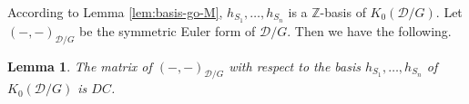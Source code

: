 \documentclass[12pt,reqno]{amsart}
\numberwithin{equation}{section}
\newcommand{\Hom}{\operatorname{Hom}\nolimits}
\newcommand{\go}{{K_0}}
\newtheorem{lemma}[theorem]{Lemma}
\begin{document}
	
	
	
	
	
	
	
	
	
	
	
	
	
	
	
	According to Lemma \ref{lem:basis-go-M}, $h_{S_1},\ldots, h_{S_n}$ is a $\mathbb{Z}$-basis of $\go(\mathcal{D}/G)$. Let $(-,-)_{\mathcal{D}/G}$ be the symmetric Euler form of $\mathcal{D}/G$. Then we have the following.
	\begin{lemma}\label{lem:Euler-form-D/G}
		The matrix of $(-,-)_{\mathcal{D}/G}$ with respect to the basis $h_{S_1},\ldots, h_{S_n}$ of $\go(\mathcal{D}/G)$ is $DC$.
	\end{lemma}
\end{document}
